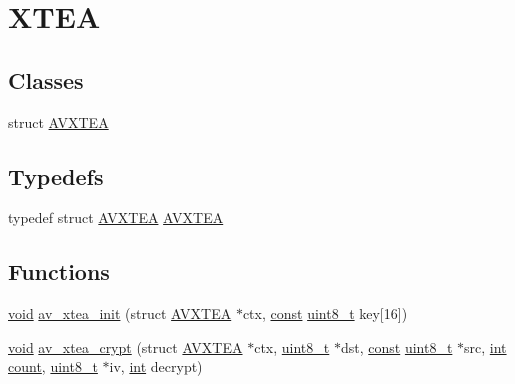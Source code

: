 \hypertarget{group__lavu__xtea}{}\section{X\+T\+EA}
\label{group__lavu__xtea}
\subsection*{Classes}
\begin{DoxyCompactItemize}
\item 
struct \hyperlink{struct_a_v_x_t_e_a}{A\+V\+X\+T\+EA}
\end{DoxyCompactItemize}
\subsection*{Typedefs}
\begin{DoxyCompactItemize}
\item 
typedef struct \hyperlink{struct_a_v_x_t_e_a}{A\+V\+X\+T\+EA} \hyperlink{group__lavu__xtea_ga89eafc5705f000441fe7c91d0597ec5f}{A\+V\+X\+T\+EA}
\end{DoxyCompactItemize}
\subsection*{Functions}
\begin{DoxyCompactItemize}
\item 
\hyperlink{sound_8c_ae35f5844602719cf66324f4de2a658b3}{void} \hyperlink{group__lavu__xtea_ga015fbc7f1062f11900dcf1c6352f2156}{av\+\_\+xtea\+\_\+init} (struct \hyperlink{struct_a_v_x_t_e_a}{A\+V\+X\+T\+EA} $\ast$ctx, \hyperlink{getopt1_8c_a2c212835823e3c54a8ab6d95c652660e}{const} \hyperlink{lib-src_2ffmpeg_2win32_2stdint_8h_a9a941819355e6f658991890ff66b4b0e}{uint8\+\_\+t} key\mbox{[}16\mbox{]})
\item 
\hyperlink{sound_8c_ae35f5844602719cf66324f4de2a658b3}{void} \hyperlink{group__lavu__xtea_gaeaf213c9d74ba6d6b3769bda4ce283fc}{av\+\_\+xtea\+\_\+crypt} (struct \hyperlink{struct_a_v_x_t_e_a}{A\+V\+X\+T\+EA} $\ast$ctx, \hyperlink{lib-src_2ffmpeg_2win32_2stdint_8h_a9a941819355e6f658991890ff66b4b0e}{uint8\+\_\+t} $\ast$dst, \hyperlink{getopt1_8c_a2c212835823e3c54a8ab6d95c652660e}{const} \hyperlink{lib-src_2ffmpeg_2win32_2stdint_8h_a9a941819355e6f658991890ff66b4b0e}{uint8\+\_\+t} $\ast$src, \hyperlink{xmltok_8h_a5a0d4a5641ce434f1d23533f2b2e6653}{int} \hyperlink{metrics_8c_afea6e77db19a2f8c91419904fe665a3a}{count}, \hyperlink{lib-src_2ffmpeg_2win32_2stdint_8h_a9a941819355e6f658991890ff66b4b0e}{uint8\+\_\+t} $\ast$iv, \hyperlink{xmltok_8h_a5a0d4a5641ce434f1d23533f2b2e6653}{int} decrypt)
\end{DoxyCompactItemize}


